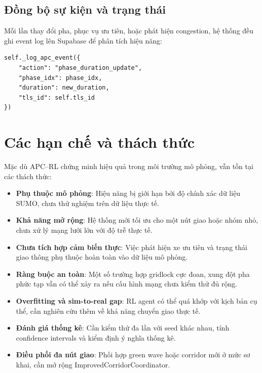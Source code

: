 \subsection{Đồng bộ sự kiện và trạng thái}

Mỗi lần thay đổi pha, phục vụ ưu tiên, hoặc phát hiện congestion, hệ thống đều ghi event log lên Supabase để phân tích hiệu năng:

\begin{lstlisting}[style=py,caption={Ghi log sự kiện lên Supabase}]
self._log_apc_event({
    "action": "phase_duration_update",
    "phase_idx": phase_idx,
    "duration": new_duration,
    "tls_id": self.tls_id
})
\end{lstlisting}

\section{Các hạn chế và thách thức}

Mặc dù APC–RL chứng minh hiệu quả trong môi trường mô phỏng, vẫn tồn tại các thách thức:

\begin{itemize}
    \item \textbf{Phụ thuộc mô phỏng}: Hiệu năng bị giới hạn bởi độ chính xác dữ liệu SUMO, chưa thử nghiệm trên dữ liệu thực tế.
    \item \textbf{Khả năng mở rộng}: Hệ thống mới tối ưu cho một nút giao hoặc nhóm nhỏ, chưa xử lý mạng lưới lớn với độ trễ thực tế.
    \item \textbf{Chưa tích hợp cảm biến thực}: Việc phát hiện xe ưu tiên và trạng thái giao thông phụ thuộc hoàn toàn vào dữ liệu mô phỏng.
    \item \textbf{Ràng buộc an toàn}: Một số trường hợp gridlock cực đoan, xung đột pha phức tạp vẫn có thể xảy ra nếu cấu hình mạng chưa kiểm thử đủ rộng.
    \item \textbf{Overfitting và sim-to-real gap}: RL agent có thể quá khớp với kịch bản cụ thể, cần nghiên cứu thêm về khả năng chuyển giao thực tế.
    \item \textbf{Đánh giá thống kê}: Cần kiểm thử đa lần với seed khác nhau, tính confidence intervals và kiểm định ý nghĩa thống kê.
    \item \textbf{Điều phối đa nút giao}: Phối hợp green wave hoặc corridor mới ở mức sơ khai, cần mở rộng ImprovedCorridorCoordinator.
\end{itemize}
